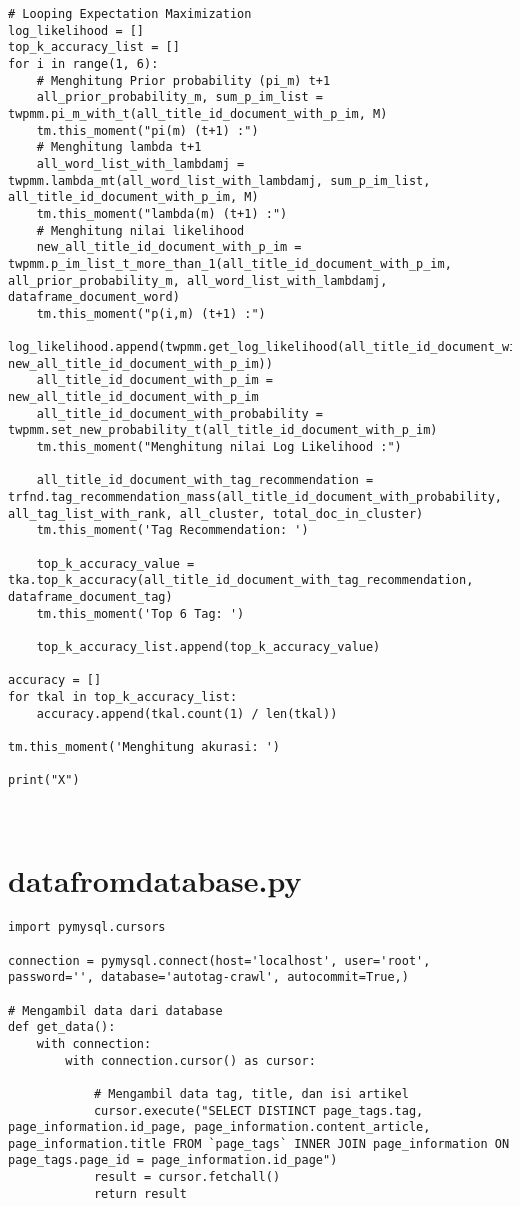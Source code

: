\begin{lstlisting}[breaklines=true]
# Looping Expectation Maximization
log_likelihood = []
top_k_accuracy_list = []
for i in range(1, 6):
	# Menghitung Prior probability (pi_m) t+1
	all_prior_probability_m, sum_p_im_list = twpmm.pi_m_with_t(all_title_id_document_with_p_im, M)
	tm.this_moment("pi(m) (t+1) :")
	# Menghitung lambda t+1
	all_word_list_with_lambdamj = twpmm.lambda_mt(all_word_list_with_lambdamj, sum_p_im_list, all_title_id_document_with_p_im, M)
	tm.this_moment("lambda(m) (t+1) :")
	# Menghitung nilai likelihood
	new_all_title_id_document_with_p_im = twpmm.p_im_list_t_more_than_1(all_title_id_document_with_p_im, all_prior_probability_m, all_word_list_with_lambdamj, dataframe_document_word)
	tm.this_moment("p(i,m) (t+1) :")
	log_likelihood.append(twpmm.get_log_likelihood(all_title_id_document_with_p_im, new_all_title_id_document_with_p_im))
	all_title_id_document_with_p_im = new_all_title_id_document_with_p_im
	all_title_id_document_with_probability = twpmm.set_new_probability_t(all_title_id_document_with_p_im)
	tm.this_moment("Menghitung nilai Log Likelihood :")

	all_title_id_document_with_tag_recommendation = trfnd.tag_recommendation_mass(all_title_id_document_with_probability, all_tag_list_with_rank, all_cluster, total_doc_in_cluster)
	tm.this_moment('Tag Recommendation: ')

	top_k_accuracy_value = tka.top_k_accuracy(all_title_id_document_with_tag_recommendation, dataframe_document_tag)
	tm.this_moment('Top 6 Tag: ')
	
	top_k_accuracy_list.append(top_k_accuracy_value)

accuracy = []
for tkal in top_k_accuracy_list:
	accuracy.append(tkal.count(1) / len(tkal))

tm.this_moment('Menghitung akurasi: ')

print("X")
	
	
\end{lstlisting}

\chapter{data\textunderscore from\textunderscore database.py}
\begin{lstlisting}[breaklines=true]
import pymysql.cursors

connection = pymysql.connect(host='localhost', user='root', password='', database='autotag-crawl', autocommit=True,)

# Mengambil data dari database
def get_data():
	with connection:
		with connection.cursor() as cursor:
				
			# Mengambil data tag, title, dan isi artikel
			cursor.execute("SELECT DISTINCT page_tags.tag, page_information.id_page, page_information.content_article, page_information.title FROM `page_tags` INNER JOIN page_information ON page_tags.page_id = page_information.id_page")
			result = cursor.fetchall()
			return result

\end{lstlisting}

